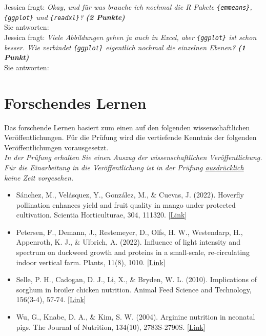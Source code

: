 \documentclass[a4paper, 9pt]{scrartcl}\usepackage[]{graphicx}\usepackage[]{xcolor}
\begin{document}
Jessica fragt: \textit{Okay, und für was brauche ich nochmal die R Pakete  \texttt{\{emmeans\}}, \texttt{\{ggplot\}} und \texttt{\{readxl\}}? \textbf{(2 Punkte)}}\\[1ex]
Sie antworten:\\[2Ex]

Jessica fragt: \textit{Viele Abbildungen gehen ja auch in Excel, aber \texttt{\{ggplot\}} ist schon besser. Wie verbindet \texttt{\{ggplot\}} eigentlich nochmal die einzelnen Ebenen? \textbf{(1 Punkt)}}\\[1ex]
Sie antworten:\\[2Ex]



 
\clearpage
\part{Forschendes Lernen}

Das forschende Lernen basiert zum einen auf den folgenden wissenschaftlichen Veröffentlichungen. Für die Prüfung wird die vertiefende Kenntnis der folgenden Veröffentlichungen vorausgesetzt.\\

\textit{In der Prüfung erhalten Sie einen Auszug der wissenschaftlichen Veröffentlichung. Für die Einarbeitung in die Veröffentlichung ist in der Prüfung \underline{ausdrücklich} keine Zeit vorgesehen.}

\begin{itemize}[noitemsep]
\item Sánchez, M., Velásquez, Y., González, M., \& Cuevas, J. (2022). Hoverfly pollination enhances yield and fruit quality in mango under protected cultivation. Scientia Horticulturae, 304, 111320. [\href{https://www.sciencedirect.com/science/article/pii/S0304423822004411}{Link}]
\item Petersen, F., Demann, J., Restemeyer, D., Olfs, H. W., Westendarp, H., Appenroth, K. J., \& Ulbrich, A. (2022). Influence of light intensity and spectrum on duckweed growth and proteins in a small-scale, re-circulating indoor vertical farm. Plants, 11(8), 1010. [\href{https://www.mdpi.com/2223-7747/11/8/1010}{Link}]
\item Selle, P. H., Cadogan, D. J., Li, X., \& Bryden, W. L. (2010). Implications of sorghum in broiler chicken nutrition. Animal Feed Science and Technology, 156(3-4), 57-74. [\href{https://www.sciencedirect.com/science/article/pii/S0377840110000209}{Link}]
\item Wu, G., Knabe, D. A., \& Kim, S. W. (2004). Arginine nutrition in neonatal pigs. The Journal of Nutrition, 134(10), 2783S-2790S. [\href{https://www.sciencedirect.com/science/article/pii/S0022316623031279}{Link}]
\end{itemize}
\end{document}
